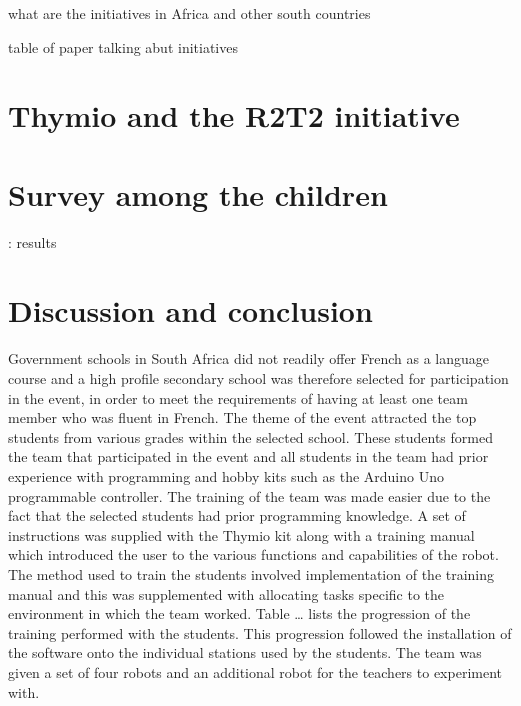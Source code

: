 \documentclass{intech-journal}
\begin{document}
what are the initiatives in Africa and other south countries

table of paper talking abut initiatives


\section{Thymio and the R2T2 initiative}

\section{Survey among the children}: results

\section{Discussion and conclusion}
Government schools in South Africa did not readily offer French as a language course and a high profile secondary school was therefore selected for participation in the event, in order to meet the requirements of having at least one team member who was fluent in French. The theme of the event attracted the top students from various grades within the selected school. These students formed the team that participated in the event and all students in the team had prior experience with programming and hobby kits such as the Arduino Uno programmable controller. 
The training of the team was made easier due to the fact that the selected students had prior programming knowledge. A set of instructions was supplied with the Thymio kit along with a training manual which introduced the user to the various functions and capabilities of the robot. The method used to train the students involved implementation of the training manual and this was supplemented with allocating tasks specific to the environment in which the team worked. Table … lists the progression of the training performed with the students. This progression followed the installation of the software onto the individual stations used by the students. The team was given a set of four robots and an additional robot for the teachers to experiment with. 
\end{document}
